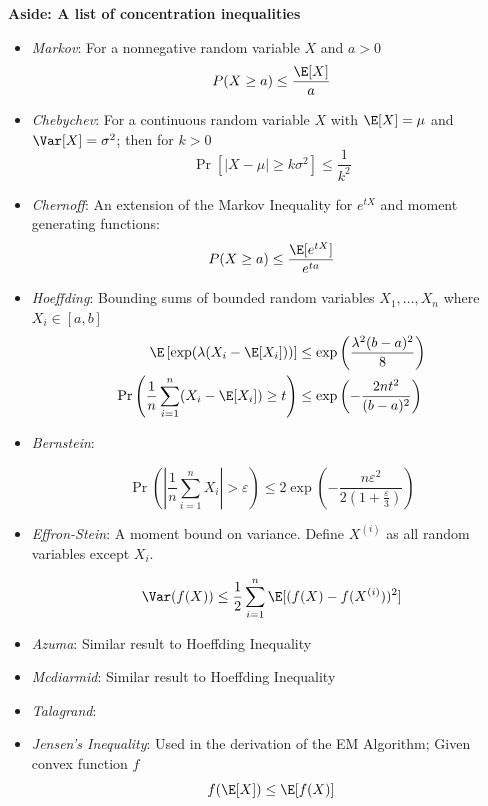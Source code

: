 \noindent
\textbf{Aside: A list of concentration inequalities}
\begin{itemize}
\item \textit{Markov}: For a nonnegative random variable $X$ and $a > 0$ $$P(X \geq a) \leq \frac{\E[X]}{a}$$ 
\item \textit{Chebychev}: For a continuous random variable $X$ with $\E[X] = \mu$ and $\Var[X] = \sigma^2$; then for $k>0$
$$\Pr[|X-\mu| \geq k\sigma^2 ] \leq \frac{1}{k^2}$$
\item \textit{Chernoff}: An extension of the Markov Inequality for $e^{tX}$ and moment generating functions: $$P(X \geq a) \leq \frac{\E[e^{tX}]}{e^{ta}}$$ 
\item \textit{Hoeffding}: Bounding sums of bounded random variables $X_1, \ldots, X_n$ where $X_i \in [a,b]$ 
\begin{align*}
  \E\left[\exp(\lambda(X_i - \E[X_i]))\right] &\leq \exp \left( \frac{\lambda^2(b-a)^2}{8}\right)\\
  \Pr\left( \frac{1}{n} \sum_{i=1}^n (X_i - \E[X_i]) \geq t\right) & \leq \exp \left( -\frac{2nt^2}{(b-a)^2}\right)
\end{align*}
\item \textit{Bernstein}: 

$$\Pr \left( \left| \frac{1}{n} \sum_{i=1}^n X_i \right| > \varepsilon\right) \leq 2 \exp \left( - \frac{n \varepsilon^2}{2(1+\frac{\varepsilon}{3})}\right)$$
\item \textit{Effron-Stein}: A moment bound on variance. Define $X^{(i)}$ as all random variables except $X_i$.

$$\Var(f(X)) \leq \frac{1}{2} \sum_{i=1}^n \E [(f(X) - f(X^{(i)}))^2]$$

\item \textit{Azuma}: Similar result to Hoeffding Inequality
\item \textit{Mcdiarmid}: Similar result to Hoeffding Inequality
\item \textit{Talagrand}: 
\item \textit{Jensen's Inequality}: Used in the derivation of the EM Algorithm; Given convex function $f$
$$f(\E[X]) \leq \E[f(X)]$$
\end{itemize}
